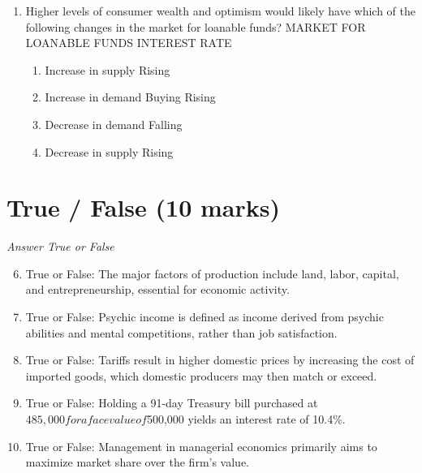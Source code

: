 \documentclass[12pt]{article}
\begin{document}
\begin{enumerate}[label=\arabic*.]
\begin{enumerate}[label=(\alph*)]
    \item 14\%
    \item 12\%
    \item 11\%
    \item 9\%
    \item 2\%
\end{enumerate}
\item Higher levels of consumer wealth and optimism would likely have which of the following changes in the market for loanable funds? MARKET FOR LOANABLE FUNDS INTEREST RATE
\begin{enumerate}[label=(\alph*)]
    \item Increase in supply Rising
    \item Increase in demand Buying Rising
    \item Decrease in demand Falling
    \item Decrease in supply Rising
\end{enumerate}
\end{enumerate}

\section*{True / False (10 marks)}
\textit{Answer True or False}
\begin{enumerate}[label=\arabic*.]
\setcounter{enumi}{5}
\item True or False: The major factors of production include land, labor, capital, and entrepreneurship, essential for economic activity.
\item True or False: Psychic income is defined as income derived from psychic abilities and mental competitions, rather than job satisfaction.
\item True or False: Tariffs result in higher domestic prices by increasing the cost of imported goods, which domestic producers may then match or exceed.
\item True or False: Holding a 91-day Treasury bill purchased at $485,000 for a face value of $500,000 yields an interest rate of 10.4\%.
\item True or False: Management in managerial economics primarily aims to maximize market share over the firm's value.
\end{enumerate}
\end{document}
